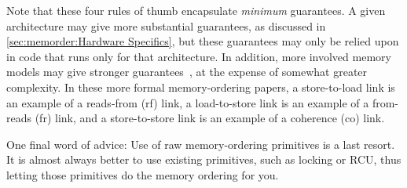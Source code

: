 Note that these four rules of thumb encapsulate \emph{minimum} guarantees.
A given architecture may give more substantial guarantees, as discussed
in \cref{sec:memorder:Hardware Specifics}, but these guarantees may only
be relied upon in code that runs only for that architecture.
In addition, more involved memory models may give stronger
guarantees~\cite{Alglave:2018:FSC:3173162.3177156}, at the
expense of somewhat greater complexity.
In these more formal memory-ordering papers, a store-to-load link is an
example of a reads-from (rf) link, a load-to-store link is an example
of a from-reads (fr) link, and a store-to-store link is an example of
a coherence (co) link.

One final word of advice: Use of raw memory-ordering primitives is
a last resort.
It is almost always better to use existing primitives, such as locking
or RCU, thus letting those primitives do the memory ordering for you.

